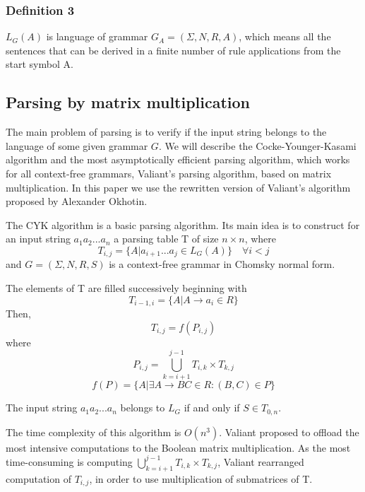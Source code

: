 \documentclass[runningheads]{llncs}
\begin{document}
\subsubsection{Definition 3} $L_{G}(A)$ is language of grammar $G_{A} = (\Sigma, N, R, A)$, which means all the sentences that can be derived in a finite number of rule applications from the start symbol A.

\subsection{Parsing by matrix multiplication}
  
The main problem of parsing is to verify if the input string belongs to the language of some given grammar $G$. We will describe the Cocke-Younger-Kasami algorithm and the most asymptotically efficient parsing algorithm, which works for all context-free grammars, Valiant's parsing algorithm, based on matrix multiplication. In this paper we use the rewritten version of Valiant's algorithm proposed by Alexander Okhotin. 

The CYK algorithm is a basic parsing algorithm. Its main idea is to construct for an input string $a_{1}a_{2}...a_{n}$ a parsing table T of size $n \times n$,  where 
\begin{equation}
T_{i, j} =  \{ A |  a_{i + 1}...a_{j} \in L_{G}(A)\} \quad \forall i < j
\end{equation}
and $G = (\Sigma, N, R, S)$ is a context-free grammar in Chomsky normal form. 

The elements of T are filled successively beginning with 
\begin{equation}
T_{i - 1, i} = \{ A | A \rightarrow a_{i} \in R\}
\end{equation}
Then, 
\begin{equation}
T_{i, j} = f(P_{i, j})
\end{equation}
where 
\begin{equation}
P_{i, j} = \bigcup\limits_{k = i + 1}^{j - 1} T_{i,k} \times T_{k, j}
\end{equation}
\begin{equation}
f(P) = \{A | \exists A \rightarrow BC \in R : (B, C) \in P\}
\end{equation}

The input string $a_{1}a_{2}...a_{n}$ belongs to $L_{G}$ if and only if $S \in T_{0, n}$.


The time complexity of this algorithm is $O(n^3)$. Valiant proposed to offload the most intensive computations to the Boolean matrix multiplication. As the most time-consuming is computing $\bigcup\limits_{k = i + 1}^{j - 1} T_{i, k} \times T_{k, j}$, Valiant rearranged computation of $T_{i, j}$, in order to use multiplication of submatrices of T. 
\end{document}
